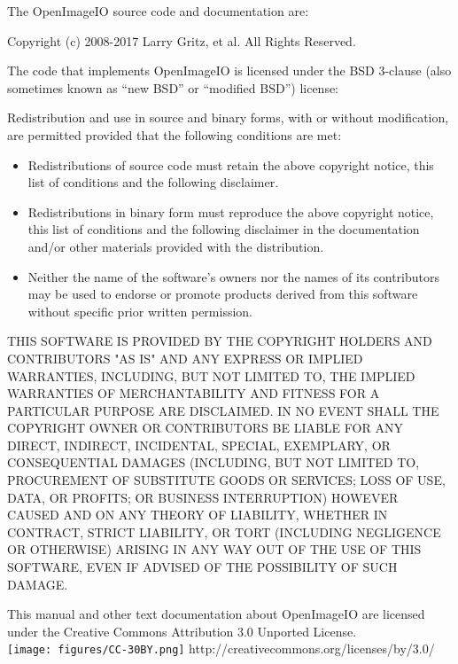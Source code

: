 \newpage
\label{speccopyr}

\vspace*{0.2in}

\noindent The OpenImageIO source code and
documentation are:

\vspace*{0.2in}

\noindent Copyright (c) 2008-2017 Larry Gritz, et al.
All Rights Reserved.

\vspace{0.5in}

The code that implements OpenImageIO is licensed under
the BSD 3-clause (also sometimes known as ``new BSD'' or
``modified BSD'') license:

\vspace{0.25in}

Redistribution and use in source and binary forms, with or without
modification, are permitted provided that the following conditions are
met:

\begin{itemize}
\item Redistributions of source code must retain the above copyright
  notice, this list of conditions and the following disclaimer.
\item Redistributions in binary form must reproduce the above copyright
  notice, this list of conditions and the following disclaimer in the
  documentation and/or other materials provided with the distribution.
\item Neither the name of the software's owners nor the names of its
  contributors may be used to endorse or promote products derived from
  this software without specific prior written permission.
\end{itemize}

THIS SOFTWARE IS PROVIDED BY THE COPYRIGHT HOLDERS AND CONTRIBUTORS
"AS IS" AND ANY EXPRESS OR IMPLIED WARRANTIES, INCLUDING, BUT NOT
LIMITED TO, THE IMPLIED WARRANTIES OF MERCHANTABILITY AND FITNESS FOR
A PARTICULAR PURPOSE ARE DISCLAIMED. IN NO EVENT SHALL THE COPYRIGHT
OWNER OR CONTRIBUTORS BE LIABLE FOR ANY DIRECT, INDIRECT, INCIDENTAL,
SPECIAL, EXEMPLARY, OR CONSEQUENTIAL DAMAGES (INCLUDING, BUT NOT
LIMITED TO, PROCUREMENT OF SUBSTITUTE GOODS OR SERVICES; LOSS OF USE,
DATA, OR PROFITS; OR BUSINESS INTERRUPTION) HOWEVER CAUSED AND ON ANY
THEORY OF LIABILITY, WHETHER IN CONTRACT, STRICT LIABILITY, OR TORT
(INCLUDING NEGLIGENCE OR OTHERWISE) ARISING IN ANY WAY OUT OF THE USE
OF THIS SOFTWARE, EVEN IF ADVISED OF THE POSSIBILITY OF SUCH DAMAGE.


\vspace{0.5in}

This manual and other text documentation about OpenImageIO
are licensed under the Creative Commons Attribution 3.0
Unported License. \\

\smallskip
\spc \texttt{[image: figures/CC-30BY.png]} 
\spc http://creativecommons.org/licenses/by/3.0/
 \bigskip 

